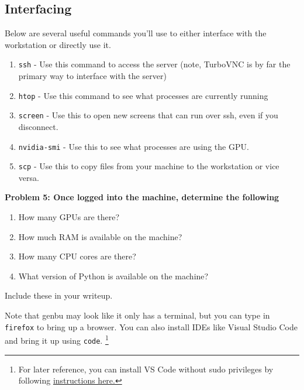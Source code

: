 \subsection*{Interfacing}
Below are several useful commands you'll use to either interface with the workstation or directly use it.
\begin{enumerate}
    \item \texttt{ssh} - Use this command to access the server (note, TurboVNC is by far the primary way to interface with the server)
	\item \texttt{htop} - Use this command to see what processes are currently running
	\item \texttt{screen} - Use this to open new screens that can run over ssh, even if you disconnect.
	\item \texttt{nvidia-smi} - Use this to see what processes are using the GPU.
    \item \texttt{scp} - Use this to copy files from your machine to the workstation or vice versa.
\end{enumerate}

{\bf Problem 5: Once logged into the machine, determine the following
\begin{enumerate}[label=(\alph*)]
    \item How many GPUs are there?
    \item How much RAM is available on the machine?
    \item How many CPU cores are there?
    \item What version of Python is available on the machine?
\end{enumerate}
Include these in your writeup.}

Note that genbu may look like it only has a terminal, but you can type in \texttt{firefox} to bring up a browser. You can also install IDEs like Visual Studio Code and bring it up using \texttt{code}. \footnote{For later reference, you can install VS Code without sudo privileges by following  \href{https://huhuidong.wordpress.com/2018/12/13/how-to-install-visual-studio-code-in-linux-without-root-or-sudo/}{instructions here.} }